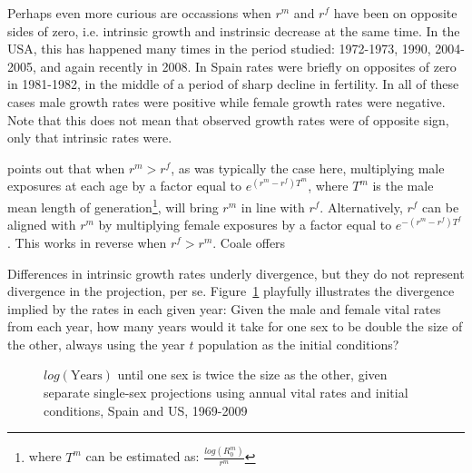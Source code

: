 Perhaps even more curious are occassions when $r^m$ and $r^f$ have been on
opposite sides of zero, i.e. intrinsic growth and instrinsic decrease at the
same time. In the USA, this has happened many times in the period studied:
1972-1973, 1990, 2004-2005, and again recently in 2008. In Spain rates were 
briefly on opposites of zero in 1981-1982, in the middle of a period of sharp
decline in fertility. In all of these cases male growth rates were positive
while female growth rates were negative. Note that this does not mean that 
observed growth rates were of opposite sign, only that intrinsic
rates were. 

\citet[p. 57]{coale1972growth} points out that when $r^m > r^f$, as was
typically the case here, multiplying male exposures at each age by a factor equal to
$e^{(r^m - r^f)T^m}$, where $T^m$ is the male mean length of
generation\footnote{where $T^m$ can be estimated as:
$\frac{log(R_0^m)}{r^m}$}, will bring $r^m$ in line with $r^f$. Alternatively,
$r^f$ can be aligned with $r^m$ by multiplying female exposures by a factor equal
 to $e^{-(r^m - r^f)T^f}$. This works in reverse when $r^f > r^m$. Coale offers 

Differences in intrinsic growth rates underly divergence, but they
do not represent divergence in the projection, per se.
Figure~\ref{fig:rSRdoubling} playfully illustrates the divergence implied by the 
rates in each given year: Given the
male and female vital rates from each year, how many years would it take for one
sex to be double the size of the other, always using the year $t$ population as
the initial conditions?

\begin{figure}[ht!]
        \centering  
          \caption{$log(\mathrm{Years})$ until one sex is twice the size as the
          other, given separate single-sex projections using annual vital rates and initial
          conditions, Spain and US, 1969-2009}
           \quad
          \label{fig:rSRdoubling}
\end{figure}

